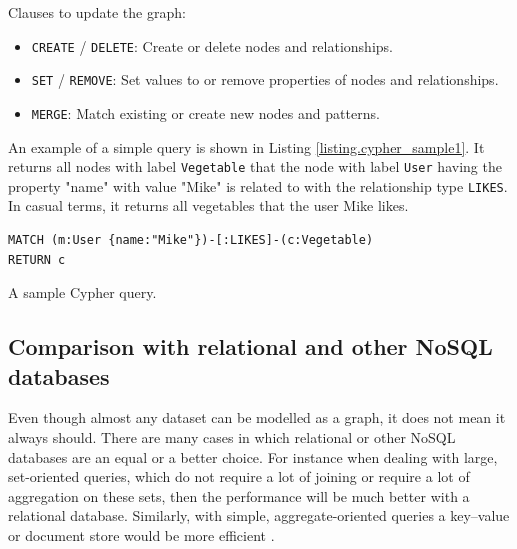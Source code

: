 \documentclass[12pt]{report}
\begin{document}
Clauses to update the graph:
\begin{itemize}
\item \texttt{CREATE} / \texttt{DELETE}: Create or delete nodes and relationships.
\item \texttt{SET} / \texttt{REMOVE}: Set values to or remove properties of nodes and relationships. 
\item \texttt{MERGE}: Match existing or create new nodes and patterns.
\end{itemize}

An example of a simple query is shown in Listing \ref{listing.cypher_sample1}. It returns all nodes with label \texttt{Vegetable} that the node with label \texttt{User} having the property "name" with value "Mike" is related to with the relationship type \texttt{LIKES}. In casual terms, it returns all vegetables that the user Mike likes.

\begin{listing}
\begin{verbatim}
MATCH (m:User {name:"Mike"})-[:LIKES]-(c:Vegetable)
RETURN c
\end{verbatim}
\caption{A sample Cypher query.}
\label{listing.cypher_sample1}
\end{listing}

\subsection{Comparison with relational and other NoSQL databases}





Even though almost any dataset can be modelled as a graph, it does not mean it always should. There are many cases in which relational or other NoSQL databases are an equal or a better choice. For instance when dealing with large, set-oriented queries, which do not require a lot of joining or require a lot of aggregation on these sets, then the performance will be much better with a relational database. Similarly, with simple, aggregate-oriented queries a key--value or document store would be more efficient \cite{learning_neo4j}.
\end{document}
